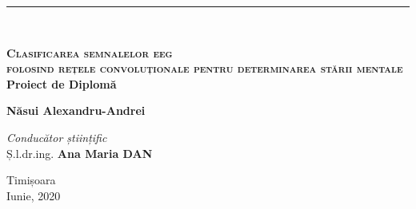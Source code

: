 \begin{titlepage}
    \noindent\rule{\textwidth}{1pt}\\[2.5cm]

    \begin{center}
        {\huge \bfseries \textsc{Clasificarea semnalelor eeg\\[0.2cm]folosind rețele convoluționale pentru determinarea stării mentale}}\\[1cm]

        {\large \bfseries Proiect de Diplomă}\\[5cm]
        
        \begin{flushright}
            \large
            \textbf{Năsui Alexandru-Andrei} \\[1.5cm]
        \end{flushright}
        \begin{flushleft}
            \large
            \textit{Conducător științific}\\
            Ș.l.dr.ing. \textbf{Ana Maria DAN} \\[1cm]
        \end{flushleft}
        \vfill
        {\small Timișoara \\Iunie, 2020}
    \end{center}
\end{titlepage}
\restoregeometry
\shipout\null